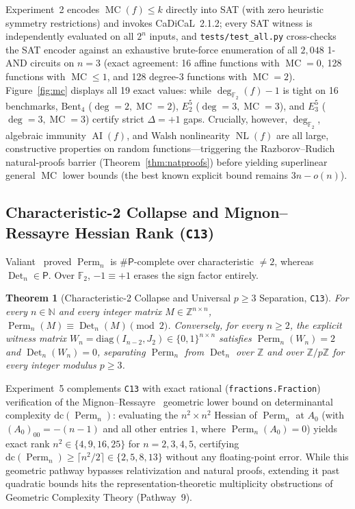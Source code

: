 \documentclass[11pt,reqno]{amsart}
\newcommand{\code}[1]{\texttt{\nolinkurl{#1}}}
\newtheorem{theorem}{Theorem}[section]
\theoremstyle{definition}
\newcommand{\F}{\mathbb{F}}
\newcommand{\Z}{\mathbb{Z}}
\newcommand{\N}{\mathbb{N}}
\newcommand{\Perm}{\operatorname{Perm}}
\newcommand{\Det}{\operatorname{Det}}
\newcommand{\MC}{\operatorname{MC}}
\newcommand{\AI}{\operatorname{AI}}
\newcommand{\NL}{\operatorname{NL}}
\newcommand{\PP}{\mathsf{P}}
\begin{document}
Experiment~2 encodes $\MC(f) \le k$ directly into SAT (with zero heuristic symmetry
restrictions) and invokes CaDiCaL~2.1.2; every SAT witness is independently evaluated on
all $2^n$ inputs, and \code{tests/test_all.py} cross-checks the SAT encoder against an
exhaustive brute-force enumeration of all $2{,}048$ 1-AND circuits on $n=3$
(exact agreement: 16 affine functions with $\MC=0$, 128 functions with $\MC \le 1$, and
128 degree-3 functions with $\MC=2$). Figure~\ref{fig:mc} displays all 19 exact values:
while $\deg_{\F_2}(f)-1$ is tight on 16 benchmarks, $\mathrm{Bent}_4$ ($\deg=2, \MC=2$),
$E_2^5$ ($\deg=3, \MC=3$), and $E_3^5$ ($\deg=3, \MC=3$) certify strict $\Delta=+1$ gaps.
Crucially, however, $\deg_{\F_2}$, algebraic immunity $\AI(f)$, and Walsh nonlinearity
$\NL(f)$ are all large, constructive properties on random functions---triggering the
Razborov--Rudich natural-proofs barrier (Theorem~\ref{thm:natproofs}) before yielding
superlinear general $\MC$ lower bounds (the best known explicit bound remains $3n - o(n)$).

\subsection{Characteristic-2 Collapse and Mignon--Ressayre Hessian Rank (\texttt{C13})}
Valiant~\cite{Valiant1979} proved $\Perm_n$ is $\#\PP$-complete over characteristic $\neq 2$,
whereas $\Det_n \in \PP$. Over $\F_2$, $-1 \equiv +1$ erases the sign factor entirely.

\begin{theorem}[Characteristic-2 Collapse and Universal $p \ge 3$ Separation, \texttt{C13}]
\label{thm:perm-det}
For every $n \in \N$ and every integer matrix $M \in \Z^{n \times n}$,
$\Perm_n(M) \equiv \Det_n(M) \pmod{2}$. Conversely, for every $n \ge 2$, the explicit
witness matrix $W_n = \mathrm{diag}(I_{n-2}, J_2) \in \{0,1\}^{n \times n}$ satisfies
$\Perm_n(W_n) = 2$ and $\Det_n(W_n) = 0$, separating $\Perm_n$ from $\Det_n$ over $\Z$
and over $\Z/p\Z$ for every integer modulus $p \ge 3$.
\end{theorem}

Experiment~5 complements \texttt{C13} with exact rational (\code{fractions.Fraction})
verification of the Mignon--Ressayre~\cite{MignonRessayre2004} geometric lower bound on
determinantal complexity $\mathrm{dc}(\Perm_n)$: evaluating the $n^2 \times n^2$ Hessian
of $\Perm_n$ at $A_0$ (with $(A_0)_{00} = -(n-1)$ and all other entries $1$, where
$\Perm_n(A_0) = 0$) yields exact rank $n^2 \in \{4, 9, 16, 25\}$ for $n=2,3,4,5$,
certifying $\mathrm{dc}(\Perm_n) \ge \lceil n^2/2 \rceil \in \{2, 5, 8, 13\}$ without any
floating-point error. While this geometric pathway bypasses relativization and natural
proofs, extending it past quadratic bounds hits the representation-theoretic multiplicity
obstructions of Geometric Complexity Theory (Pathway~9).
\end{document}

